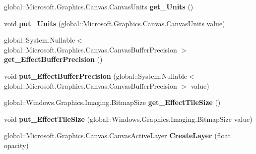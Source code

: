 \begin{DoxyCompactItemize}
global\+::\+Microsoft.\+Graphics.\+Canvas.\+Canvas\+Units {\bfseries get\+\_\+\+Units} ()
\item 
\mbox{\label{interface_microsoft_1_1_graphics_1_1_canvas_1_1_i_canvas_drawing_session_a1910a6196e05633ca23601d76333d316}} 
void {\bfseries put\+\_\+\+Units} (global\+::\+Microsoft.\+Graphics.\+Canvas.\+Canvas\+Units value)
\item 
\mbox{\label{interface_microsoft_1_1_graphics_1_1_canvas_1_1_i_canvas_drawing_session_af23d6053469a4364d9c8c27e7377c289}} 
global\+::\+System.\+Nullable$<$ global\+::\+Microsoft.\+Graphics.\+Canvas.\+Canvas\+Buffer\+Precision $>$ {\bfseries get\+\_\+\+Effect\+Buffer\+Precision} ()
\item 
\mbox{\label{interface_microsoft_1_1_graphics_1_1_canvas_1_1_i_canvas_drawing_session_a0750c7ecd4686f6086a55c2d26d83532}} 
void {\bfseries put\+\_\+\+Effect\+Buffer\+Precision} (global\+::\+System.\+Nullable$<$ global\+::\+Microsoft.\+Graphics.\+Canvas.\+Canvas\+Buffer\+Precision $>$ value)
\item 
\mbox{\label{interface_microsoft_1_1_graphics_1_1_canvas_1_1_i_canvas_drawing_session_af9496956d42a3cfccf103766bd55a411}} 
global\+::\+Windows.\+Graphics.\+Imaging.\+Bitmap\+Size {\bfseries get\+\_\+\+Effect\+Tile\+Size} ()
\item 
\mbox{\label{interface_microsoft_1_1_graphics_1_1_canvas_1_1_i_canvas_drawing_session_a4c45f8e3daf366e71487f64ae934e755}} 
void {\bfseries put\+\_\+\+Effect\+Tile\+Size} (global\+::\+Windows.\+Graphics.\+Imaging.\+Bitmap\+Size value)
\item 
\mbox{\label{interface_microsoft_1_1_graphics_1_1_canvas_1_1_i_canvas_drawing_session_a184d966bb56bf3a3cdb5c53f3ef9f3c1}} 
global\+::\+Microsoft.\+Graphics.\+Canvas.\+Canvas\+Active\+Layer {\bfseries Create\+Layer} (float opacity)
\item 

\end{DoxyCompactItemize}
